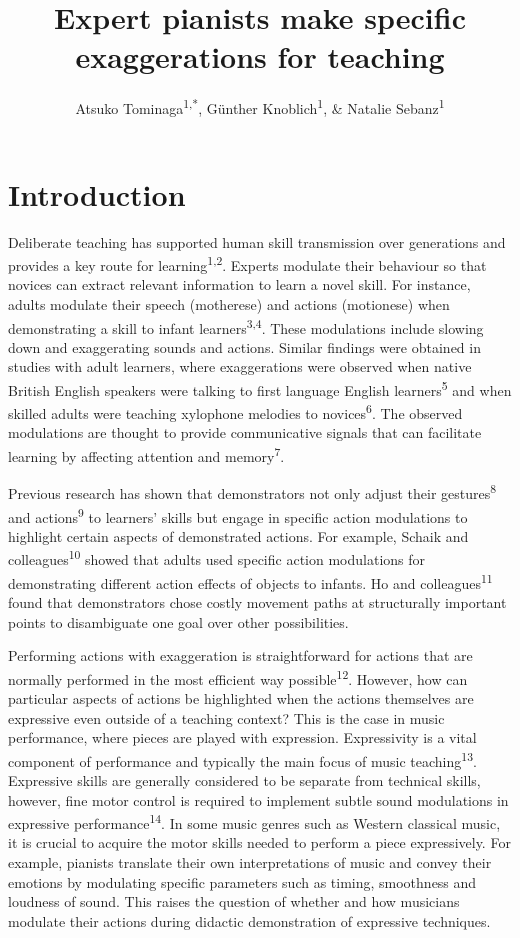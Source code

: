 \documentclass[
  man,floatsintext]{apa6}
\title{Expert pianists make specific exaggerations for teaching}
\author{Atsuko Tominaga\textsuperscript{1,*}, Günther Knoblich\textsuperscript{1}, \& Natalie Sebanz\textsuperscript{1}}
\date{}
\affiliation{\vspace{0.5cm}\textsuperscript{1} Department of Cognitive Science, Central European University, Quellenstraße 51, 1100 Vienna, Austria\\\textsuperscript{*} Corresponding author: \href{mailto:Tominaga_Atsuko@phd.ceu.edu}{\nolinkurl{Tominaga\_Atsuko@phd.ceu.edu}}}
\begin{document}
\maketitle

\hypertarget{introduction}{%
\section{Introduction}\label{introduction}}

Deliberate teaching has supported human skill transmission over generations and provides a key route for learning\textsuperscript{1,2}. Experts modulate their behaviour so that novices can extract relevant information to learn a novel skill. For instance, adults modulate their speech (motherese) and actions (motionese) when demonstrating a skill to infant learners\textsuperscript{3,4}. These modulations include slowing down and exaggerating sounds and actions. Similar findings were obtained in studies with adult learners, where exaggerations were observed when native British English speakers were talking to first language English learners\textsuperscript{5} and when skilled adults were teaching xylophone melodies to novices\textsuperscript{6}. The observed modulations are thought to provide communicative signals that can facilitate learning by affecting attention and memory\textsuperscript{7}.

Previous research has shown that demonstrators not only adjust their gestures\textsuperscript{8} and actions\textsuperscript{9} to learners' skills but engage in specific action modulations to highlight certain aspects of demonstrated actions. For example, Schaik and colleagues\textsuperscript{10} showed that adults used specific action modulations for demonstrating different action effects of objects to infants. Ho and colleagues\textsuperscript{11} found that demonstrators chose costly movement paths at structurally important points to disambiguate one goal over other possibilities.

Performing actions with exaggeration is straightforward for actions that are normally performed in the most efficient way possible\textsuperscript{12}. However, how can particular aspects of actions be highlighted when the actions themselves are expressive even outside of a teaching context? This is the case in music performance, where pieces are played with expression. Expressivity is a vital component of performance and typically the main focus of music teaching\textsuperscript{13}. Expressive skills are generally considered to be separate from technical skills, however, fine motor control is required to implement subtle sound modulations in expressive performance\textsuperscript{14}. In some music genres such as Western classical music, it is crucial to acquire the motor skills needed to perform a piece expressively. For example, pianists translate their own interpretations of music and convey their emotions by modulating specific parameters such as timing, smoothness and loudness of sound. This raises the question of whether and how musicians modulate their actions during didactic demonstration of expressive techniques.
\end{document}
